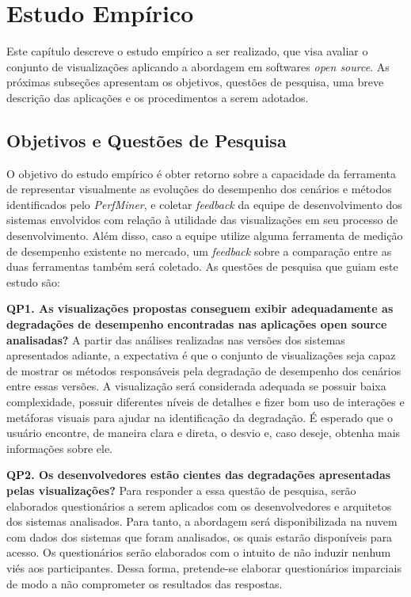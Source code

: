 \chapter{Estudo Empírico} \label{ch:estudo-empirico}

Este capítulo descreve o estudo empírico a ser realizado, que visa avaliar o conjunto de visualizações aplicando a abordagem em softwares \textit{open source}. As próximas subseções apresentam os objetivos, questões de pesquisa, uma breve descrição das aplicações e os procedimentos a serem adotados.

\section{Objetivos e Questões de Pesquisa} \label{sec:objetivos-questoes-pesquisa}

O objetivo do estudo empírico é obter retorno sobre a capacidade da ferramenta de representar visualmente as evoluções do desempenho dos cenários e métodos identificados pelo \textit{PerfMiner}, e coletar \textit{feedback} da equipe de desenvolvimento dos sistemas envolvidos com relação à utilidade das visualizações em seu processo de desenvolvimento. Além disso, caso a equipe utilize alguma ferramenta de medição de desempenho existente no mercado, um \textit{feedback} sobre a comparação entre as duas ferramentas também será coletado. As questões de pesquisa que guiam este estudo são:

\textbf{QP1. As visualizações propostas conseguem exibir adequadamente as degradações de desempenho encontradas nas aplicações open source analisadas?} A partir das análises realizadas nas versões dos sistemas apresentados adiante, a expectativa é que o conjunto de visualizações seja capaz de mostrar os métodos responsáveis pela degradação de desempenho dos cenários entre essas versões. A visualização será considerada adequada se possuir baixa complexidade, possuir diferentes níveis de detalhes e fizer bom uso de interações e metáforas visuais para ajudar na identificação da degradação. É esperado que o usuário encontre, de maneira clara e direta, o desvio e, caso deseje, obtenha mais informações sobre ele.

\textbf{QP2. Os desenvolvedores estão cientes das degradações apresentadas pelas visualizações?} Para responder a essa questão de pesquisa, serão elaborados questionários a serem aplicados com os desenvolvedores e arquitetos dos sistemas analisados. Para tanto, a abordagem será disponibilizada na nuvem com dados dos sistemas que foram analisados, os quais estarão disponíveis para acesso. Os questionários serão elaborados com o intuito de não induzir nenhum viés aos participantes. Dessa forma, pretende-se elaborar questionários imparciais de modo a não comprometer os resultados das respostas.

